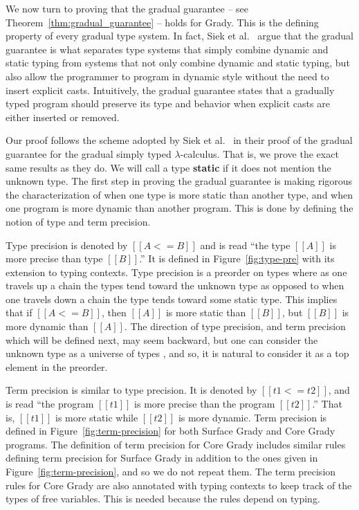 We now turn to proving that the gradual guarantee -- see
Theorem~\ref{thm:gradual_guarantee} -- holds for Grady.  This is the
defining property of every gradual type system.  In fact, Siek et
al.~\cite{Siek:2015} argue that the gradual guarantee is what
separates type systems that simply combine dynamic and static typing
from systems that not only combine dynamic and static typing, but also
allow the programmer to program in dynamic style without the need to
insert explicit casts.  Intuitively, the gradual guarantee states that
a gradually typed program should preserve its type and behavior when
explicit casts are either inserted or removed.

Our proof follows the scheme adopted by Siek et al.~\cite{Siek:2015}
in their proof of the gradual guarantee for the gradual simply typed
$\lambda$-calculus.  That is, we prove the exact same results as they
do.  We will call a type \textbf{static} if it does not mention the
unknown type.  The first step in proving the gradual guarantee is
making rigorous the characterization of when one type is more static
than another type, and when one program is more dynamic than another
program.  This is done by defining the notion of type and term
precision.

Type precision is denoted by $[[A <= B]]$ and is read ``the type
$[[A]]$ is more precise than type $[[B]]$.'' It is defined in
Figure~\ref{fig:type-pre} with its extension to typing contexts.  Type
precision is a preorder on types where as one travels up a chain the
types tend toward the unknown type as opposed to when one travels down
a chain the type tends toward some static type.  This implies that if
$[[A <= B]]$, then $[[A]]$ is more static than $[[B]]$, but $[[B]]$ is
more dynamic than $[[A]]$.  The direction of type precision, and term
precision which will be defined next, may seem backward, but one can
consider the unknown type as a universe of types \cite{Garcia:2016},
and so, it is natural to consider it as a top element in the preorder.

Term precision is similar to type precision.  It is denoted by $[[t1
    <= t2]]$, and is read ``the program $[[t1]]$ is more precise than
the program $[[t2]]$.''  That is, $[[t1]]$ is more static while
$[[t2]]$ is more dynamic.  Term precision is defined in
Figure~\ref{fig:term-precision} for both Surface Grady and Core Grady
programs.  The definition of term precision for Core Grady includes
similar rules defining term precision for Surface Grady in addition to
the ones given in Figure~\ref{fig:term-precision}, and so we do not
repeat them.  The term precision rules for Core Grady are also
annotated with typing contexts to keep track of the types of free
variables. This is needed because the rules depend on typing.

